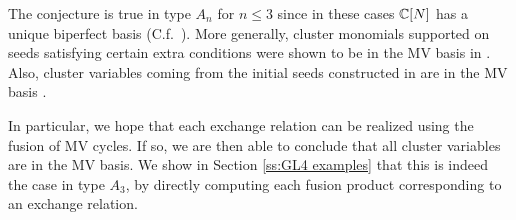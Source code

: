 \documentclass[draft]{article} %
\begin{document}
The conjecture is true in type $A_n$ for $n\leq 3$ 
since in these cases $\mathbb C[N]$ has a unique biperfect basis (C.f.\ \cite{baumann2019mirkovic}).
% 
More generally, cluster monomials supported on seeds satisfying certain extra conditions were shown to be in the MV basis in \cite{baumann2020bases}. 
Also, cluster variables coming from the initial seeds constructed in \cite{berenstein2005cluster3} are in the MV basis \cite{baumann2019mirkovic}. 



In particular, we hope that each exchange relation can be realized using the fusion of MV cycles. If so, we are then able to conclude that all cluster variables are in the MV basis. We show in Section \ref{ss:GL4 examples} that this is indeed the case in type $A_3$, by directly computing each fusion product corresponding to an exchange relation.

\end{document}
